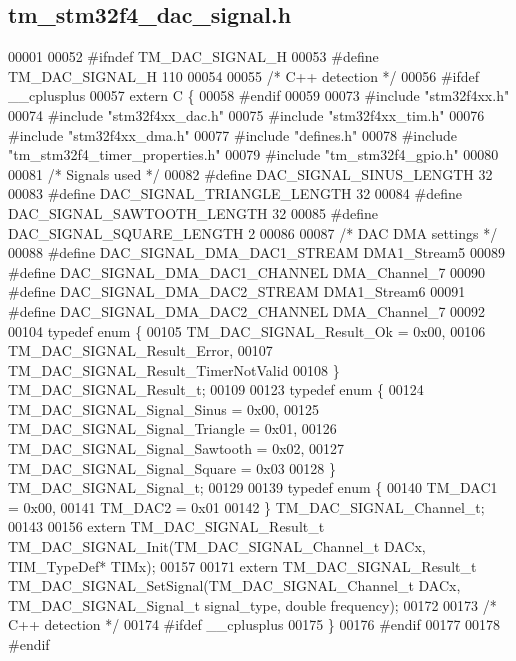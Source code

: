 \hypertarget{tm__stm32f4__dac__signal_8h_source}{}\subsection{tm\+\_\+stm32f4\+\_\+dac\+\_\+signal.\+h}

\begin{DoxyCode}
00001 
00052 \textcolor{preprocessor}{#ifndef TM\_DAC\_SIGNAL\_H}
00053 \textcolor{preprocessor}{#define TM\_DAC\_SIGNAL\_H 110}
00054 
00055 \textcolor{comment}{/* C++ detection */}
00056 \textcolor{preprocessor}{#ifdef \_\_cplusplus}
00057 \textcolor{keyword}{extern} C \{
00058 \textcolor{preprocessor}{#endif}
00059 
00073 \textcolor{preprocessor}{#include "stm32f4xx.h"}
00074 \textcolor{preprocessor}{#include "stm32f4xx\_dac.h"}
00075 \textcolor{preprocessor}{#include "stm32f4xx\_tim.h"}
00076 \textcolor{preprocessor}{#include "stm32f4xx\_dma.h"}
00077 \textcolor{preprocessor}{#include "defines.h"}
00078 \textcolor{preprocessor}{#include "tm\_stm32f4\_timer\_properties.h"}
00079 \textcolor{preprocessor}{#include "tm\_stm32f4\_gpio.h"}
00080 
00081 \textcolor{comment}{/* Signals used */}
00082 \textcolor{preprocessor}{#define DAC\_SIGNAL\_SINUS\_LENGTH         32}
00083 \textcolor{preprocessor}{#define DAC\_SIGNAL\_TRIANGLE\_LENGTH      32}
00084 \textcolor{preprocessor}{#define DAC\_SIGNAL\_SAWTOOTH\_LENGTH      32}
00085 \textcolor{preprocessor}{#define DAC\_SIGNAL\_SQUARE\_LENGTH        2}
00086 
00087 \textcolor{comment}{/* DAC DMA settings */}
00088 \textcolor{preprocessor}{#define DAC\_SIGNAL\_DMA\_DAC1\_STREAM      DMA1\_Stream5}
00089 \textcolor{preprocessor}{#define DAC\_SIGNAL\_DMA\_DAC1\_CHANNEL     DMA\_Channel\_7}
00090 \textcolor{preprocessor}{#define DAC\_SIGNAL\_DMA\_DAC2\_STREAM      DMA1\_Stream6}
00091 \textcolor{preprocessor}{#define DAC\_SIGNAL\_DMA\_DAC2\_CHANNEL     DMA\_Channel\_7}
00092 
00104 \textcolor{keyword}{typedef} \textcolor{keyword}{enum} \{
00105     TM\_DAC\_SIGNAL\_Result\_Ok = 0x00,
00106     TM\_DAC\_SIGNAL\_Result\_Error,
00107     TM\_DAC\_SIGNAL\_Result\_TimerNotValid
00108 \} TM\_DAC\_SIGNAL\_Result\_t;
00109 
00123 \textcolor{keyword}{typedef} \textcolor{keyword}{enum} \{
00124     TM\_DAC\_SIGNAL\_Signal\_Sinus = 0x00,
00125     TM\_DAC\_SIGNAL\_Signal\_Triangle = 0x01,
00126     TM\_DAC\_SIGNAL\_Signal\_Sawtooth = 0x02,
00127     TM\_DAC\_SIGNAL\_Signal\_Square = 0x03
00128 \} TM\_DAC\_SIGNAL\_Signal\_t;
00129 
00139 \textcolor{keyword}{typedef} \textcolor{keyword}{enum} \{
00140     TM\_DAC1 = 0x00,
00141     TM\_DAC2 = 0x01
00142 \} TM\_DAC\_SIGNAL\_Channel\_t;
00143 
00156 \textcolor{keyword}{extern} TM\_DAC\_SIGNAL\_Result\_t TM\_DAC\_SIGNAL\_Init(TM\_DAC\_SIGNAL\_Channel\_t DACx, TIM\_TypeDef* TIMx);
00157 
00171 \textcolor{keyword}{extern} TM\_DAC\_SIGNAL\_Result\_t TM\_DAC\_SIGNAL\_SetSignal(TM\_DAC\_SIGNAL\_Channel\_t DACx, TM\_DAC\_SIGNAL\_Signal\_t 
      signal\_type, \textcolor{keywordtype}{double} frequency);
00172 
00173 \textcolor{comment}{/* C++ detection */}
00174 \textcolor{preprocessor}{#ifdef \_\_cplusplus}
00175 \}
00176 \textcolor{preprocessor}{#endif}
00177 
00178 \textcolor{preprocessor}{#endif}
\end{DoxyCode}
